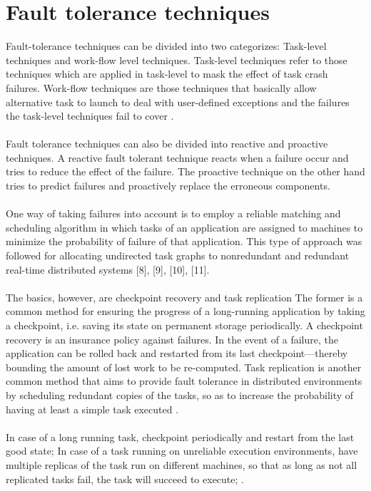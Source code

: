 \documentclass{cslthse-msc}
\begin{document}
 
\section{Fault tolerance techniques}
Fault-tolerance techniques can be divided into two categorizes:
Task-level techniques and work-flow level techniques.
Task-level techniques refer to those techniques which are applied in task-level to mask the effect of task crash failures. Work-flow techniques are those techniques that basically allow alternative task to launch to deal with user-defined exceptions and the failures the task-level techniques fail to cover \cite{gridWorkflow}.
\\\\
Fault tolerance techniques can also be divided into reactive and proactive techniques. A reactive fault tolerant technique reacts when a failure occur and tries to reduce the effect of the failure. The proactive technique on the other hand tries to predict failures and proactively replace the erroneous components.
\\\\
One way of taking failures into account is to employ a reliable matching and scheduling algorithm in which tasks of an application are assigned to machines to minimize the probability of failure of that application. This type of approach was followed for allocating undirected task graphs to nonredundant and redundant real-time distributed systems [8], [9], [10], [11].
\\\\
The basics, however, are checkpoint recovery and task replication The former is a common method for ensuring the progress of a long-running application by taking a checkpoint, i.e. saving its state on permanent storage periodically. A checkpoint recovery is an insurance policy against failures. In the event of a failure, the application can be rolled back and restarted from its last checkpoint—thereby bounding the amount of lost work to be re-computed. Task replication is another common method that aims to provide fault tolerance in distributed environments by scheduling redundant copies of the tasks, so as to increase the probability of having at least a simple task executed  \cite{effTaskReplMobGrid}. 
\\\\
In case of a long running task, checkpoint periodically and restart from the last good state;
In case of a task running on unreliable execution environments, have multiple replicas of the task run on different machines, so that as long as not all replicated tasks fail, the task will succeed to execute; \cite{gridWorkflow}.
\end{document}
